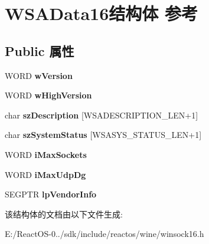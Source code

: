 \hypertarget{struct_w_s_a_data16}{}\section{W\+S\+A\+Data16结构体 参考}
\label{struct_w_s_a_data16}
\subsection*{Public 属性}
\begin{DoxyCompactItemize}
\item 
\mbox{\label{struct_w_s_a_data16_a0e02c61e109b41a00f79b8b1d5495c95}} 
W\+O\+RD {\bfseries w\+Version}
\item 
\mbox{\label{struct_w_s_a_data16_a8012db17ffc0f00839bcc1c52a52c303}} 
W\+O\+RD {\bfseries w\+High\+Version}
\item 
\mbox{\label{struct_w_s_a_data16_ad9518b8d2274f2c7501b135eadba1a47}} 
char {\bfseries sz\+Description} \mbox{[}W\+S\+A\+D\+E\+S\+C\+R\+I\+P\+T\+I\+O\+N\+\_\+\+L\+EN+1\mbox{]}
\item 
\mbox{\label{struct_w_s_a_data16_a5ed556126f40683fcbb5f6f8b6157833}} 
char {\bfseries sz\+System\+Status} \mbox{[}W\+S\+A\+S\+Y\+S\+\_\+\+S\+T\+A\+T\+U\+S\+\_\+\+L\+EN+1\mbox{]}
\item 
\mbox{\label{struct_w_s_a_data16_a8d4a7c33421254c837d3c40c3e7e7b58}} 
W\+O\+RD {\bfseries i\+Max\+Sockets}
\item 
\mbox{\label{struct_w_s_a_data16_af8ce063cb75741ec7607517e1761446f}} 
W\+O\+RD {\bfseries i\+Max\+Udp\+Dg}
\item 
\mbox{\label{struct_w_s_a_data16_a1d716980a15219782451d1ab1d56bd9b}} 
S\+E\+G\+P\+TR {\bfseries lp\+Vendor\+Info}
\end{DoxyCompactItemize}


该结构体的文档由以下文件生成\+:\begin{DoxyCompactItemize}
\item 
E\+:/\+React\+O\+S-\/0../sdk/include/reactos/wine/winsock16.\+h\end{DoxyCompactItemize}
